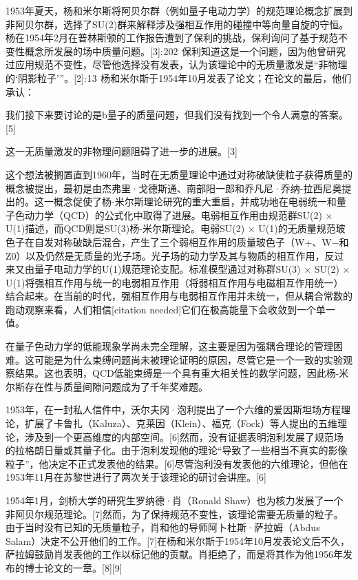 1953年夏天，杨和米尔斯将阿贝尔群（例如量子电动力学）的规范理论概念扩展到非阿贝尔群，选择了SU(2)群来解释涉及强相互作用的碰撞中等向量自旋的守恒。杨在1954年2月在普林斯顿的工作报告遭到了保利的挑战，保利询问了基于规范不变性概念所发展的场中质量问题。[3]: 202  保利知道这是一个问题，因为他曾研究过应用规范不变性，尽管他选择没有发表，认为该理论中的无质量激发是“非物理的‘阴影粒子’”。[2]: 13  杨和米尔斯于1954年10月发表了论文；在论文的最后，他们承认：

我们接下来要讨论的是b量子的质量问题，但我们没有找到一个令人满意的答案。[5]

这一无质量激发的非物理问题阻碍了进一步的进展。[3]

这个想法被搁置直到1960年，当时在无质量理论中通过对称破缺使粒子获得质量的概念被提出，最初是由杰弗里·戈德斯通、南部阳一郎和乔凡尼·乔纳-拉西尼奥提出的。这一概念促使了杨-米尔斯理论研究的重大重启，并成功地在电弱统一和量子色动力学（QCD）的公式化中取得了进展。电弱相互作用由规范群SU(2) × U(1)描述，而QCD则是SU(3)杨-米尔斯理论。电弱SU(2) × U(1)的无质量规范玻色子在自发对称破缺后混合，产生了三个弱相互作用的质量玻色子（W+、W−和Z0）以及仍然是无质量的光子场。光子场的动力学及其与物质的相互作用，反过来又由量子电动力学的U(1)规范理论支配。标准模型通过对称群SU(3) × SU(2) × U(1)将强相互作用与统一的电弱相互作用（将弱相互作用与电磁相互作用统一）结合起来。在当前的时代，强相互作用与电弱相互作用并未统一，但从耦合常数的跑动观察来看，人们相信[citation needed]它们在极高能量下会收敛到一个单一值。

在量子色动力学的低能现象学尚未完全理解，这主要是因为强耦合理论的管理困难。这可能是为什么束缚问题尚未被理论证明的原因，尽管它是一个一致的实验观察结果。这也表明，QCD低能束缚是一个具有重大相关性的数学问题，因此杨-米尔斯存在性与质量间隙问题成为了千年奖难题。

1953年，在一封私人信件中，沃尔夫冈·泡利提出了一个六维的爱因斯坦场方程理论，扩展了卡鲁扎（Kaluza）、克莱因（Klein）、福克（Fock）等人提出的五维理论，涉及到一个更高维度的内部空间。[6]然而，没有证据表明泡利发展了规范场的拉格朗日量或其量子化。由于泡利发现他的理论“导致了一些相当不真实的影像粒子”，他决定不正式发表他的结果。[6]尽管泡利没有发表他的六维理论，但他在1953年11月在苏黎世进行了两次关于该理论的研讨会讲座。[6]

1954年1月，剑桥大学的研究生罗纳德·肖（Ronald Shaw）也为核力发展了一个非阿贝尔规范理论。[7]然而，为了保持规范不变性，该理论需要无质量的粒子。由于当时没有已知的无质量粒子，肖和他的导师阿卜杜斯·萨拉姆（Abdus Salam）决定不公开他们的工作。[7]在杨和米尔斯于1954年10月发表论文后不久，萨拉姆鼓励肖发表他的工作以标记他的贡献。肖拒绝了，而是将其作为他1956年发布的博士论文的一章。[8][9]


